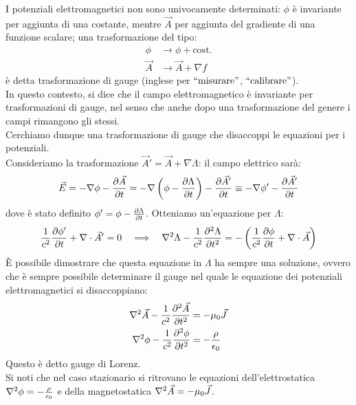 \documentclass[]{article}
\begin{document}
I potenziali elettromagnetici non sono univocamente determinati: $ \phi $ è invariante per aggiunta di una costante, mentre $ \vec{A} $ per aggiunta del gradiente di una funzione scalare; una trasformazione del tipo:
\begin{equation}
	\begin{split}
		\phi &\longrightarrow \phi + \text{cost.} \\ 
		\vec{A} &\longrightarrow \vec{A} + \nabla f
	\end{split}
	\label{eq:76}
\end{equation}
è detta trasformazione di gauge (inglese per $ ``\text{misurare}" $, $ ``\text{calibrare}" $). \\ 
In questo contesto, si dice che il campo elettromagnetico è invariante per trasformazioni di gauge, nel senso che anche dopo una trasformazione del genere i campi rimangono gli stessi. \\ 
%
Cerchiamo dunque una trasformazione di gauge che disaccoppi le equazioni per i potenziali. \\ 
%
Consideriamo la trasformazione $ \vec{A}' = \vec{A} + \nabla\Lambda $: il campo elettrico sarà:
\begin{equation}
	\vec{E} = -\nabla\phi - \frac{\partial\vec{A}}{\partial t} = -\nabla\left(\phi - \frac{\partial \Lambda}{\partial t}\right) - \frac{\partial\vec{A}'}{\partial t} \equiv -\nabla\phi' - \frac{\partial\vec{A}'}{\partial t}
	\label{eq:77}
\end{equation}
dove è stato definito $ \phi' = \phi - \frac{\partial \Lambda}{\partial t} $. Otteniamo un'equazione per $ \Lambda $:
\begin{equation}
	\frac{1}{c^2} \frac{\partial\phi'}{\partial t} + \nabla\cdot\vec{A}' = 0 \quad\Longrightarrow\quad \nabla^2 \Lambda - \frac{1}{c^2} \frac{\partial^2 \Lambda}{\partial t^2} = - \left( \frac{1}{c^2} \frac{\partial \phi}{\partial t} + \nabla\cdot\vec{A}\right)
	\label{eq:78}
\end{equation}
È possibile dimostrare che questa equazione in $ \Lambda $ ha sempre una soluzione, ovvero che è sempre possibile determinare il gauge nel quale le equazione dei potenziali elettromagnetici si disaccoppiano:
\begin{align}
	\nabla^2\vec{A} - \frac{1}{c^2} \frac{\partial^2 \vec{A}}{\partial t^2} &= - \mu_0 \vec{J} \\ 
	\nabla^2\phi - \frac{1}{c^2} \frac{\partial^2 \phi}{\partial t^2} &= - \frac{\rho}{\epsilon_0}
	\label{eq:79-80}
\end{align}
Questo è detto gauge di Lorenz.	\\ 
Si noti che nel caso stazionario si ritrovano le equazioni dell'elettrostatica $ \nabla^2\phi = - \frac{\rho}{\epsilon_0} $ e della magnetostatica $ \nabla^2\vec{A} = -\mu_0 \vec{J} $. \\ 
\end{document}
